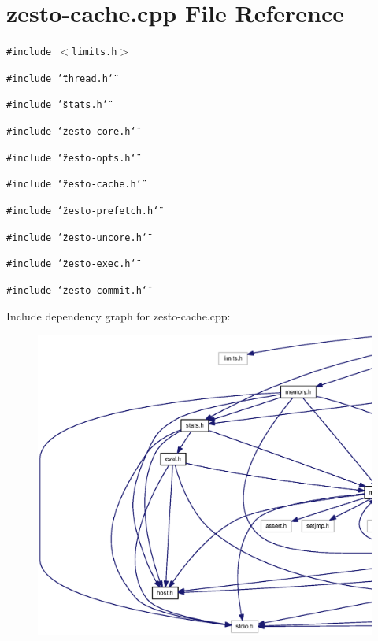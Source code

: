 \section{zesto-cache.cpp File Reference}
\label{zesto-cache_8cpp}
{\tt \#include $<$limits.h$>$}\par
{\tt \#include \char`\"{}thread.h\char`\"{}}\par
{\tt \#include \char`\"{}stats.h\char`\"{}}\par
{\tt \#include \char`\"{}zesto-core.h\char`\"{}}\par
{\tt \#include \char`\"{}zesto-opts.h\char`\"{}}\par
{\tt \#include \char`\"{}zesto-cache.h\char`\"{}}\par
{\tt \#include \char`\"{}zesto-prefetch.h\char`\"{}}\par
{\tt \#include \char`\"{}zesto-uncore.h\char`\"{}}\par
{\tt \#include \char`\"{}zesto-exec.h\char`\"{}}\par
{\tt \#include \char`\"{}zesto-commit.h\char`\"{}}\par


Include dependency graph for zesto-cache.cpp:\nopagebreak
\begin{figure}[H]
\begin{center}
\leavevmode
\includegraphics[width=420pt]{zesto-cache_8cpp__incl}
\end{center}
\end{figure}
